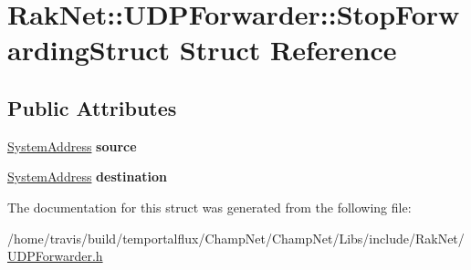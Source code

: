 \hypertarget{struct_rak_net_1_1_u_d_p_forwarder_1_1_stop_forwarding_struct}{\section{Rak\-Net\-:\-:U\-D\-P\-Forwarder\-:\-:Stop\-Forwarding\-Struct Struct Reference}
\label{struct_rak_net_1_1_u_d_p_forwarder_1_1_stop_forwarding_struct}
}
\subsection*{Public Attributes}
\begin{DoxyCompactItemize}
\item 
\hypertarget{struct_rak_net_1_1_u_d_p_forwarder_1_1_stop_forwarding_struct_a0ba2e5fd30e67124ae3eef28bd40a4a5}{\hyperlink{struct_rak_net_1_1_system_address}{System\-Address} {\bfseries source}}\label{struct_rak_net_1_1_u_d_p_forwarder_1_1_stop_forwarding_struct_a0ba2e5fd30e67124ae3eef28bd40a4a5}

\item 
\hypertarget{struct_rak_net_1_1_u_d_p_forwarder_1_1_stop_forwarding_struct_a3dd05b4d3fd84e595bfa11216398f729}{\hyperlink{struct_rak_net_1_1_system_address}{System\-Address} {\bfseries destination}}\label{struct_rak_net_1_1_u_d_p_forwarder_1_1_stop_forwarding_struct_a3dd05b4d3fd84e595bfa11216398f729}

\end{DoxyCompactItemize}


The documentation for this struct was generated from the following file\-:\begin{DoxyCompactItemize}
\item 
/home/travis/build/temportalflux/\-Champ\-Net/\-Champ\-Net/\-Libs/include/\-Rak\-Net/\hyperlink{_u_d_p_forwarder_8h}{U\-D\-P\-Forwarder.\-h}\end{DoxyCompactItemize}
